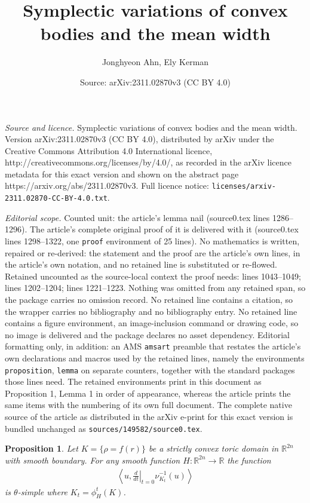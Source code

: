 \documentclass[10pt,a4paper]{amsart}
\title{Symplectic variations of convex bodies and the mean width}
\author{Jonghyeon Ahn, Ely Kerman}
\date{Source: arXiv:2311.02870v3 (CC BY 4.0)}
\newtheorem{proposition}{Proposition}
\newcommand{\RR}{{\mathbb R}}
\begin{document}
\maketitle

\noindent\emph{Source and licence.} Symplectic variations of convex bodies and the mean width. Version arXiv:2311.02870v3 (CC BY 4.0), distributed by arXiv under the Creative Commons Attribution 4.0 International licence, http://creativecommons.org/licenses/by/4.0/, as recorded in the arXiv licence metadata for this exact version and shown on the abstract page https://arxiv.org/abs/2311.02870v3. Full licence notice: \texttt{licenses/arxiv-2311.02870-CC-BY-4.0.txt}.\par\smallskip

\noindent\textit{Editorial scope.} Counted unit: the article's lemma nail (source0.tex lines 1286--1296). The article's complete original proof of it is delivered with it (source0.tex lines 1298--1322, one \texttt{proof} environment of 25 lines). No mathematics is written, repaired or re-derived: the statement and the proof are the article's own lines, in the article's own notation, and no retained line is substituted or re-flowed.  Retained uncounted as the source-local context the proof needs: lines 1043--1049; lines 1202--1204; lines 1221--1223.  Nothing was omitted from any retained span, so the package carries no omission record.  No retained line contains a citation, so the wrapper carries no bibliography and no bibliography entry.  No retained line contains a figure environment, an image-inclusion command or drawing code, so no image is delivered and the package declares no asset dependency.  Editorial formatting only, in addition: an AMS \texttt{amsart} preamble that restates the article's own declarations and macros used by the retained lines, namely the environments \texttt{proposition}, \texttt{lemma} on separate counters, together with the standard packages those lines need.  The retained environments print in this document as Proposition 1, Lemma 1 in order of appearance, whereas the article prints the same items with the numbering of its own full document.  The complete native source of the article as distributed in the arXiv e-print for this exact version is bundled unchanged as \texttt{sources/149582/source0.tex}.
\begin{proposition}\label{form}
Let $K =\{\rho=f(r)\}$ be a strictly convex toric domain in $\RR^{2n}$ with smooth boundary. For any smooth function $H \colon \RR^{2n} \to \RR$ the function
\begin{align*}
\left\langle u, \left.\frac{d}{dt}\right|_{t=0} \nu^{-1}_{K_t}(u)\right\rangle
\end{align*}
is $\theta$-simple where $K_t =\phi^t_H(K)$.
\end{proposition}
\end{document}
